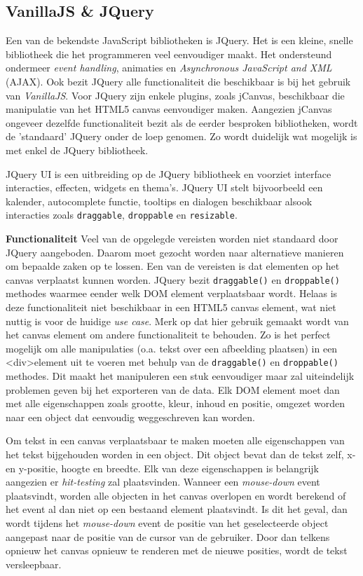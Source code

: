 \subsection{VanillaJS \& JQuery}
Een van de bekendste JavaScript bibliotheken is JQuery. Het is een kleine, snelle bibliotheek die het programmeren veel eenvoudiger maakt. Het ondersteund ondermeer \textit{event handling}, animaties en \textit{Asynchronous JavaScript and XML} (AJAX). Ook bezit JQuery alle functionaliteit die beschikbaar is bij het gebruik van \textit{VanillaJS}. Voor JQuery zijn enkele plugins, zoals jCanvas, beschikbaar die manipulatie van het HTML5 canvas eenvoudiger maken. %
Aangezien jCanvas ongeveer dezelfde functionaliteit bezit als de eerder besproken bibliotheken, wordt de 'standaard' JQuery onder de loep genomen. Zo wordt duidelijk wat mogelijk is met enkel de JQuery bibliotheek.

JQuery UI is een uitbreiding op de JQuery bibliotheek en voorziet interface interacties, effecten, widgets en thema's. JQuery UI stelt bijvoorbeeld een kalender, autocomplete functie, tooltips en dialogen beschikbaar alsook interacties zoals \texttt{draggable}, \texttt{droppable} en \texttt{resizable}. 

\textbf{Functionaliteit} \break
Veel van de opgelegde vereisten worden niet standaard door JQuery aangeboden. Daarom moet gezocht worden naar alternatieve manieren om bepaalde zaken op te lossen. Een van de vereisten is dat elementen op het canvas verplaatst kunnen worden. JQuery bezit \texttt{draggable()} en \texttt{droppable()} methodes waarmee eender welk DOM element verplaatsbaar wordt. Helaas is deze functionaliteit niet beschikbaar in een HTML5 canvas element, wat niet nuttig is voor de huidige \textit{use case}. Merk op dat hier gebruik gemaakt wordt van het canvas element om andere functionaliteit te behouden. Zo is het perfect mogelijk om alle manipulaties (o.a. tekst over een afbeelding plaatsen) in een \textless div\textgreater element uit te voeren met behulp van de \texttt{draggable()} en \texttt{droppable()} methodes. Dit maakt het manipuleren een stuk eenvoudiger maar zal uiteindelijk problemen geven bij het exporteren van de data. Elk DOM element moet dan met alle eigenschappen zoals grootte, kleur, inhoud en positie, omgezet worden naar een object dat eenvoudig weggeschreven kan worden. 

Om tekst in een canvas verplaatsbaar te maken moeten alle eigenschappen van het tekst bijgehouden worden in een object. Dit object bevat dan de tekst zelf, x-en y-positie, hoogte en breedte. Elk van deze eigenschappen is belangrijk aangezien er \textit{hit-testing} zal plaatsvinden. Wanneer een \textit{mouse-down} event plaatsvindt, worden alle objecten in het canvas overlopen en wordt berekend of het event al dan niet op een bestaand element plaatsvindt. Is dit het geval, dan wordt tijdens het \textit{mouse-down} event de positie van het geselecteerde object aangepast naar de positie van de cursor van de gebruiker. Door dan telkens opnieuw het canvas opnieuw te renderen met de nieuwe posities, wordt de tekst versleepbaar.

